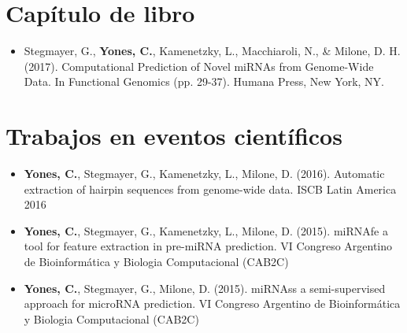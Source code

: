 \section*{Capítulo de libro}
\begin{itemize}
	\item Stegmayer, G., \textbf{Yones, C.}, Kamenetzky, L., Macchiaroli, N., \& Milone, D. H. (2017). Computational Prediction of Novel miRNAs from
		Genome-Wide Data. In Functional Genomics (pp. 29-37). Humana Press, New York, NY.
\end{itemize}

\section*{Trabajos en eventos científicos}
\begin{itemize}
	\item \textbf{Yones, C.}, Stegmayer, G., Kamenetzky, L., Milone, D. (2016). Automatic extraction of hairpin sequences from genome-wide data. ISCB Latin
		America 2016
	\item \textbf{Yones, C.}, Stegmayer, G., Kamenetzky, L., Milone, D. (2015). miRNAfe a tool for feature extraction in pre-miRNA prediction. VI Congreso
		Argentino de Bioinformática y Biologia Computacional (CAB2C)
	\item \textbf{Yones, C.}, Stegmayer, G., Milone, D. (2015). miRNAss a semi-supervised approach for microRNA prediction. VI Congreso Argentino de
		Bioinformática y Biologia Computacional (CAB2C)
\end{itemize}
